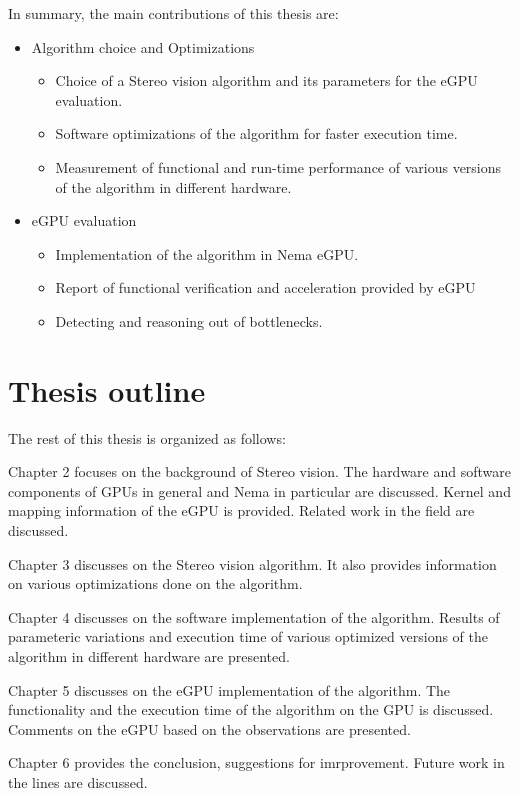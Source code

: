 In summary, the main contributions of this thesis are:

\begin{itemize}
\item{Algorithm choice and Optimizations}
  \begin{itemize}
    \item Choice of a Stereo vision algorithm and its parameters for the eGPU evaluation.
    \item Software optimizations of the algorithm for faster execution time.
    \item Measurement of functional and run-time performance of various versions of the algorithm in different hardware.
  \end{itemize}
\item {eGPU evaluation}
     \begin{itemize}
    \item Implementation of the algorithm in Nema eGPU.
    \item Report of functional verification and acceleration provided by eGPU
    \item Detecting and reasoning out of bottlenecks.
    \end{itemize}
\end{itemize}
\section{Thesis outline}
\label{sec:intro:outline}

The rest of this thesis is organized as follows:

\begin{compactitem}
  \item Chapter 2 focuses on the background of Stereo vision. The hardware and software components of GPUs in general and Nema in particular are discussed. Kernel and mapping information of the eGPU is provided. Related work in the field are discussed.
  \item Chapter 3 discusses on the Stereo vision algorithm. It also provides information on various optimizations done on the algorithm.
  \item Chapter 4 discusses on the software implementation of the algorithm. Results of parameteric variations and execution time of various optimized versions of the algorithm in different hardware are presented. 
  \item Chapter 5 discusses on the eGPU implementation of the algorithm. The functionality and the execution time of the algorithm on the GPU is discussed. Comments on the eGPU based on the observations are presented.
  \item Chapter 6 provides the conclusion, suggestions for imrprovement. Future work in the lines are discussed.
\end{compactitem}